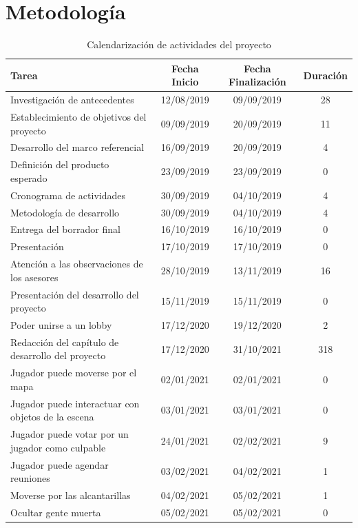 \section{Metodología}
\begin{longtable}[c]{|m{5cm}|c|c|c|}
\caption{Calendarización de actividades del proyecto \label{table:fechas_actividades}}\\
\hline
        Tarea & Fecha Inicio & Fecha Finalización & Duración \\ \hline
        Investigación de antecedentes & 12/08/2019 & 09/09/2019 & 28 \\ \hline
        Establecimiento de objetivos del proyecto & 09/09/2019 & 20/09/2019 & 11 \\ \hline
        Desarrollo del marco referencial & 16/09/2019 & 20/09/2019 & 4 \\ \hline
        Definición del producto esperado & 23/09/2019 & 23/09/2019 & 0 \\ \hline
        Cronograma de actividades & 30/09/2019 & 04/10/2019 & 4 \\ \hline
        Metodología de desarrollo & 30/09/2019 & 04/10/2019 & 4 \\ \hline
        Entrega del borrador final & 16/10/2019 & 16/10/2019 & 0 \\ \hline
        Presentación & 17/10/2019 & 17/10/2019 & 0 \\ \hline
        Atención a las observaciones de los asesores & 28/10/2019 & 13/11/2019 & 16 \\ \hline
        Presentación del desarrollo del proyecto & 15/11/2019 & 15/11/2019 & 0 \\ \hline
        Poder unirse a un lobby & 17/12/2020 & 19/12/2020 & 2 \\ \hline
        Redacción del capítulo de desarrollo del proyecto & 17/12/2020 & 31/10/2021 & 318 \\ \hline
        Jugador puede moverse por el mapa & 02/01/2021 & 02/01/2021 & 0 \\ \hline
        Jugador puede interactuar con objetos de la escena & 03/01/2021 & 03/01/2021 & 0 \\ \hline
        Jugador puede votar por un jugador como culpable & 24/01/2021 & 02/02/2021 & 9 \\ \hline
        Jugador puede agendar reuniones & 03/02/2021 & 04/02/2021 & 1 \\ \hline
        Moverse por las alcantarillas & 04/02/2021 & 05/02/2021 & 1 \\ \hline
        Ocultar gente muerta & 05/02/2021 & 05/02/2021 & 0 \\ \hline

\end{longtable}
